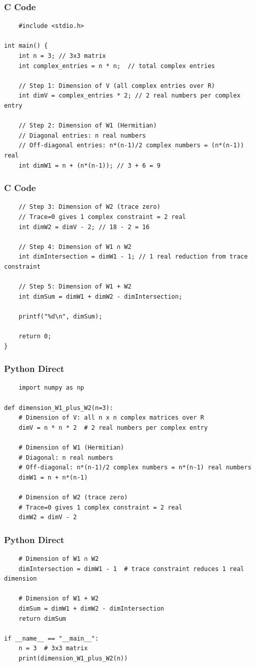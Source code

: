 \documentclass{beamer}
\begin{document}
\begin{frame}[fragile]
\frametitle{C Code}
\begin{lstlisting}
    #include <stdio.h>

int main() {
    int n = 3; // 3x3 matrix
    int complex_entries = n * n;  // total complex entries
    
    // Step 1: Dimension of V (all complex entries over R)
    int dimV = complex_entries * 2; // 2 real numbers per complex entry

    // Step 2: Dimension of W1 (Hermitian)
    // Diagonal entries: n real numbers
    // Off-diagonal entries: n*(n-1)/2 complex numbers = (n*(n-1)) real
    int dimW1 = n + (n*(n-1)); // 3 + 6 = 9
\end{lstlisting}
\end{frame}
\begin{frame}[fragile]
\frametitle{C Code}
\begin{lstlisting}
    // Step 3: Dimension of W2 (trace zero)
    // Trace=0 gives 1 complex constraint = 2 real
    int dimW2 = dimV - 2; // 18 - 2 = 16

    // Step 4: Dimension of W1 ∩ W2
    int dimIntersection = dimW1 - 1; // 1 real reduction from trace constraint

    // Step 5: Dimension of W1 + W2
    int dimSum = dimW1 + dimW2 - dimIntersection;

    printf("%d\n", dimSum);

    return 0;
}
\end{lstlisting}
\end{frame}
\begin{frame}[fragile]
\frametitle{Python Direct}
\begin{lstlisting}
    import numpy as np

def dimension_W1_plus_W2(n=3):
    # Dimension of V: all n x n complex matrices over R
    dimV = n * n * 2  # 2 real numbers per complex entry

    # Dimension of W1 (Hermitian)
    # Diagonal: n real numbers
    # Off-diagonal: n*(n-1)/2 complex numbers = n*(n-1) real numbers
    dimW1 = n + n*(n-1)

    # Dimension of W2 (trace zero)
    # Trace=0 gives 1 complex constraint = 2 real
    dimW2 = dimV - 2
\end{lstlisting}
\end{frame}
\begin{frame}[fragile]
\frametitle{Python Direct}
\begin{lstlisting}
    # Dimension of W1 ∩ W2
    dimIntersection = dimW1 - 1  # trace constraint reduces 1 real dimension

    # Dimension of W1 + W2
    dimSum = dimW1 + dimW2 - dimIntersection
    return dimSum

if __name__ == "__main__":
    n = 3  # 3x3 matrix
    print(dimension_W1_plus_W2(n))
\end{lstlisting}
\end{frame}
\end{document}
